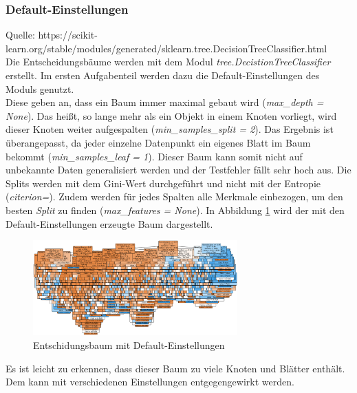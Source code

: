 \subsubsection{Default-Einstellungen}
Quelle: https://scikit-learn.org/stable/modules/generated/sklearn.tree.DecisionTreeClassifier.html\\
Die Entscheidungsbäume werden mit dem Modul \emph{tree.DecistionTreeClassifier} erstellt. Im ersten Aufgabenteil werden dazu die Default-Einstellungen des Moduls genutzt.\\
\noindent \hspace*{7mm}
Diese geben an, dass ein Baum immer maximal gebaut wird (\emph{max\_depth = None}). Das heißt, so lange mehr als ein Objekt in einem Knoten vorliegt, wird dieser Knoten weiter aufgespalten (\emph{min\_samples\_split = 2}). Das Ergebnis ist überangepasst, da jeder einzelne Datenpunkt ein eigenes Blatt im Baum bekommt (\emph{min\_samples\_leaf = 1}). Dieser Baum kann somit nicht auf unbekannte Daten generalisiert werden und der Testfehler fällt sehr hoch aus. Die Splits werden mit dem Gini-Wert durchgeführt und nicht mit der Entropie (\emph{citerion=}). Zudem werden für jedes Spalten alle Merkmale einbezogen, um den besten \emph{Split} zu finden (\emph{max\_features = None}). In Abbildung \ref{fig:treedefault} wird der mit den Default-Einstellungen erzeugte Baum dargestellt.
\begin{figure}[h]
	\centering
	\includegraphics[width = 0.7\textwidth]{Bilder/treedefault}
	\caption{Entschidungsbaum mit Default-Einstellungen}
	\label{fig:treedefault}
\end{figure}
Es ist leicht zu erkennen, dass dieser Baum zu viele Knoten und Blätter enthält. Dem kann mit verschiedenen Einstellungen entgegengewirkt werden.
